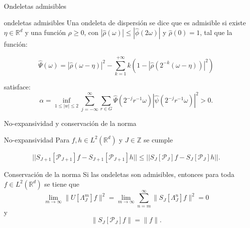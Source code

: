 \documentclass[aspectratio=43]{beamer}
\begin{document}
\begin{frame}{Ondeletas admisibles}
  
  \begin{block}{ondeletas admisibles}
    Una ondeleta de dispersión se dice que es admisible si existe $\eta \in \mathbb{R}^d$ y una función $\rho \geq 0$, con $|\widehat{\rho}(\omega)| \leq |\widehat{\phi}(2\omega)|$ y $\widehat{\rho}(0)=1$, tal que la función: 

    \begin{equation}\label{eq::1.6}
      \widehat{\Psi}(\omega)=|\widehat{\rho}(\omega - \eta)|^2 - \sum_{k=1}^{+\infty} k(1-|\widehat{\rho}(2^{-k}(\omega - \eta))|^2)
    \end{equation}
      
    \noindent satisface: 
    \begin{equation} \label{eq::1.7}
      \alpha= \inf_{1\leq|w|\leq2} \sum_{j=-\infty}^{\infty} \sum_{r\in G} \widehat{\Psi} (2^{-j}r^{-1}\omega)|\widehat{\psi}(2^{-j}r^{-1}\omega)|^2>0.
    \end{equation}
  \end{block}


\end{frame}

\begin{frame}{No-expansividad y conservación de la norma}

  \begin{alertblock}{No-expansividad}
    \noindent Para $f,h \in L^2(\mathbb{R}^d)$ y $J\in \mathbb{Z}$ se cumple

    \begin{equation} \label{eq::1.10}
      || S_{J+1} [\mathcal{P}_{J+1}]f- S_{J+1}[\mathcal{P}_{J+1}]h || \leq ||S_J[\mathcal{P}_J]f - S_J[\mathcal{P}_J]h ||. 
    \end{equation}
  \end{alertblock}

  \begin{alertblock}{Conservación de la norma}
    Si las ondeletas son admisibles, entonces para toda $f\in L^2(\mathbb{R}^d)$ se tiene que
    \begin{equation}  
      \lim_{m\rightarrow\infty} \|U[\Lambda_J^m]f \|^2=\lim_{m\rightarrow\infty} \sum_{n=m}^{\infty} \|S_J[\Lambda_J^n]f\|^2=0
    \end{equation}
    y
    \begin{equation}
      \|S_J[\mathcal{P}_J]f\|=\|f\|.
    \end{equation}
  \end{alertblock}
\end{frame}
\end{document}
